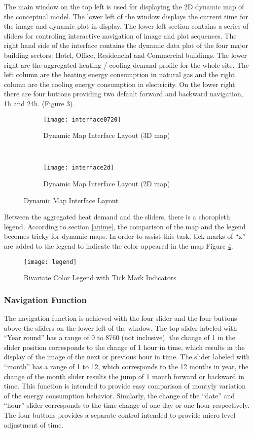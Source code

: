 \documentclass[hidelinks,12pt]{article}
\newcommand{\fref}[1]{Figure \ref{#1}}
\begin{document}
The main window on the top left is used for displaying the 2D dynamic
map of the conceptual model. The lower left of the window displays the
current time for the image and dynamic plot in display. The lower left
section contains a series of sliders for controling interactive
navigation of image and plot sequences. The right hand side of the
interface contains the dynamic data plot of the four major building
sectors: Hotel, Office, Residencial and Commercial buildings. The
lower right are the aggregated heating / cooling demand profile for
the whole site. The left column are the heating energy consumption in
natural gas and the right column are the cooling energy consumption in
electricity. On the lower right there are four buttons providing two
default forward and backward navigation, 1h and
24h. (\fref{fig:interfaceLayout}).
\begin{figure}[h!]
  \centering
  \begin{subfigure}
  \centering
  \texttt{[image: interface0720]}
  \caption{Dynamic Map Interface Layout (3D map)}
  \label{fig:interface0720}
\end{subfigure}
~
\begin{subfigure}
  \centering
  \texttt{[image: interface2d]}
  \caption{Dynamic Map Interface Layout (2D map)}
  \label{fig:interface2d}
\end{subfigure}
\caption{Dynamic Map Interface Layout}
\label{fig:interfaceLayout}
\end{figure}
Between the aggregated heat demand and the sliders, there is a
choropleth legend. According to section \ref{anime}, the comparison of
the map and the legend becomes tricky for dynamic maps. In order to
assist this task, tick marks of ``x'' are added to the legend to
indicate the color appeared in the map \fref{fig:legend}.
\begin{figure}[h!]
  \centering
  \texttt{[image: legend]}
  \caption{Bivariate Color Legend with Tick Mark Indicators}
  \label{fig:legend}
\end{figure}
\subsubsection {Navigation Function}
The navigation function is achieved with the four slider and the four
buttons above the sliders on the lower left of the window. The top
slider labeled with ``Year round'' has a range of 0 to 8760 (not
inclusive). the change of 1 in the slider position corresponds to the
change of 1 hour in time, which results in the display of the image of
the next or previous hour in time. The slider labeled with ``month''
has a range of 1 to 12, which corresponds to the 12 months in year,
the change of the month slider results the jump of 1 month forward or
backward in time. This function is intended to provide easy comparison
of montyly variation of the energy consumption behavior. Similarly,
the change of the ``date'' and ``hour'' slider corresponds to the time
change of one day or one hour respectively. The four buttons provides
a separate control intended to provide micro level adjustment of time.
\end{document}
